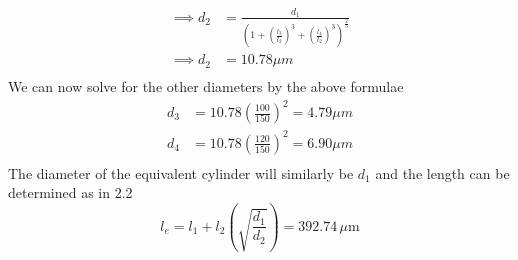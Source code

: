 \documentclass[12pt]{article}
\begin{document}
\begin{enumerate}
\begin{align*}
        \implies d_{2} &= \frac{d_{1}}{\left(1 + \left(\frac{l_{3}}{l_{2}}\right)^{3} + \left(\frac{l_{4}}{l_{2}}\right)^{3}\right)^{\frac{2}{3}}}\\
        \implies d_{2} &= 10.78 \mu m\\
    \end{align*}
    We can now solve for the other diameters by the above formulae
    \begin{align*}
        d_{3} &= 10.78\left(\frac{100}{150}\right)^{2} = 4.79 \mu m\\
        d_{4} &= 10.78\left(\frac{120}{150}\right)^{2} = 6.90 \mu m\\
    \end{align*}
    The diameter of the equivalent cylinder will similarly be $d_{1}$ and the length can be determined as in 2.2
    $$l_{e} = l_{1} + l_{2}\left(\sqrt{\frac{d_{1}}{d_{2}}}\right) = 392.74 \, \mu \text{m}$$
\end{enumerate}
\end{document}
